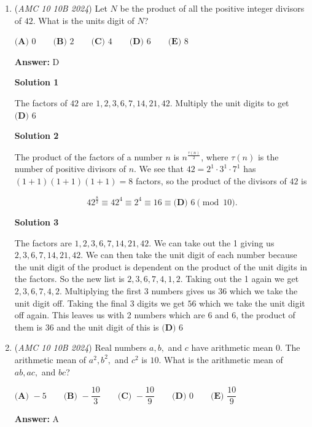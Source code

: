 \begin{enumerate}
 


	\item (\textit{AMC 10 10B 2024}) Let $N$ be the product of all the positive integer divisors of $42$. What is the units digit
of $N$?


 $\textbf{(A) } 0\qquad\textbf{(B) } 2\qquad\textbf{(C) } 4\qquad\textbf{(D) } 6\qquad\textbf{(E) } 8$

 \textbf{Answer: }D



\textbf{Solution 1}

The factors of $42$ are $1, 2, 3, 6, 7, 14, 21, 42$. Multiply the unit digits to get $\boxed{\textbf{(D) } 6}$




\textbf{Solution 2}

The product of the factors of a number $n$ is $n^\frac{\tau(n)}{2}$, where $\tau(n)$ is the number of positive divisors of $n$. We see that $42 = 2^1 \cdot 3^1 \cdot 7^1$ has $(1+1)(1+1)(1+1) = 8$ factors, so the product of the divisors of $42$ is

 
 \[42^{\frac{8}{2}} \equiv 42^4 \equiv 2^4 \equiv 16 \equiv \boxed{\textbf{(D) } 6} \pmod{10}.\]




\textbf{Solution 3}

The factors are $1, 2, 3, 6, 7, 14, 21, 42$. We can take out the 1 giving us $2, 3, 6, 7, 14, 21, 42$. We can then take the unit digit of each number because the unit digit of the product is dependent on the product of the unit digits in the factors. So the new list is $2, 3, 6, 7, 4, 1, 2$. Taking out the 1 again we get $2, 3, 6, 7, 4, 2$. Multiplying the first 3 numbers gives us $36$ which we take the unit digit off. Taking the final 3 digits we get $56$ which we take the unit digit off again. This leaves us with 2 numbers which are $6$ and $6$, the product of them is 36 and the unit digit of this is $\boxed{\textbf{(D) } 6}$



	\item (\textit{AMC 10 10B 2024}) Real numbers $a, b,$ and $c$ have arithmetic mean $0$. The arithmetic mean of $a^2, b^2,$ and $c^2$ is $10$. What is the arithmetic mean of $ab, ac,$ and $bc$?


 $\textbf{(A) } -5 \qquad\textbf{(B) } -\dfrac{10}{3} \qquad\textbf{(C) } -\dfrac{10}{9} \qquad\textbf{(D) } 0 \qquad\textbf{(E) } \dfrac{10}{9}$

 \textbf{Answer: }A




\end{enumerate}
